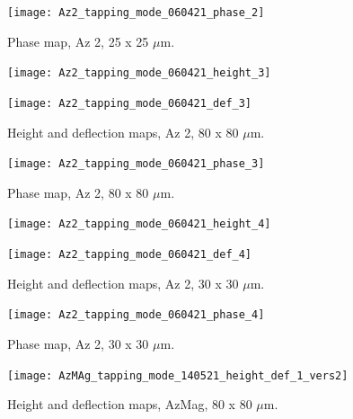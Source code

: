 \begin{figure}[H]
\centering
  \texttt{[image: Az2\_tapping\_mode\_060421\_phase\_2]}
\caption[Phase map, Az 2]{Phase map, Az 2, 25 x 25 $\mu$m.}
\label{fig:afm_az2_phase_2}
\end{figure}

\begin{figure}[H]
\centering
\begin{minipage}{.45\textwidth}
  \centering
  \texttt{[image: Az2\_tapping\_mode\_060421\_height\_3]}
\end{minipage}
\begin{minipage}{.45\textwidth}
  \centering
  \texttt{[image: Az2\_tapping\_mode\_060421\_def\_3]}
\end{minipage}
\caption[Height and deflection maps, Az 2]{Height and deflection maps, Az 2, 80 x 80 $\mu$m.}
\label{fig:afm_az2_height_def_3}
\end{figure}

\begin{figure}[H]
\centering
  \texttt{[image: Az2\_tapping\_mode\_060421\_phase\_3]}
\caption[Phase map, Az 2]{Phase map, Az 2, 80 x 80 $\mu$m.}
\label{fig:afm_az2_phase_3}
\end{figure}

\begin{figure}[H]
\centering
\begin{minipage}{.45\textwidth}
  \centering
  \texttt{[image: Az2\_tapping\_mode\_060421\_height\_4]}
\end{minipage}
\begin{minipage}{.45\textwidth}
  \centering
  \texttt{[image: Az2\_tapping\_mode\_060421\_def\_4]}
\end{minipage}
\caption[Height and deflection maps, Az 2]{Height and deflection maps, Az 2, 30 x 30 $\mu$m.}
\label{fig:afm_az2_height_def_4}
\end{figure}

\begin{figure}[H]
\centering
  \texttt{[image: Az2\_tapping\_mode\_060421\_phase\_4]}
\caption[Phase map, Az 2]{Phase map, Az 2, 30 x 30 $\mu$m.}
\label{fig:afm_az2_phase_4}
\end{figure}


\begin{figure}[H]
\centering
  \texttt{[image: AzMAg\_tapping\_mode\_140521\_height\_def\_1\_vers2]}
\caption[Height and deflection maps, AzMag]{Height and deflection maps, AzMag, 80 x 80 $\mu$m.}
\label{fig:afm_azmag_height_def_1}
\end{figure}

